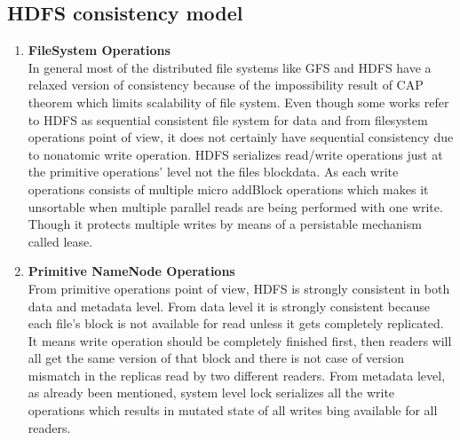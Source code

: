 \subsection{HDFS consistency model}
\begin{enumerate}
\item \textbf{FileSystem Operations}\\
In  general  most  of  the  distributed  file  systems   like  GFS  and  HDFS  have  a  relaxed
version  of  consistency   because  of  the  impossibility   result  of  CAP  theorem \cite{cap}
which  limits   scalability   of  file  system.  Even  though  some  works   refer  to  HDFS  as
sequential  consistent  file  system   for  data  and  from   filesystem   operations   point  of
view,  it  does   not  certainly   have  sequential  consistency   due  to  nonatomic   write
operation.  HDFS  serializes   read/write  operations  just at the primitive operations’ level
not  the  files   blockdata.  As  each write operations  consists  of multiple micro addBlock
operations   which  makes   it  unsortable  when  multiple  parallel  reads   are  being
performed with one write. Though it protects  multiple writes  by  means  of a persistable
mechanism called lease.
\item \textbf{Primitive NameNode Operations}\\
From   primitive  operations   point  of  view, HDFS is  strongly  consistent in both data and
metadata level.
From   data  level  it  is   strongly   consistent  because  each  file’s   block   is  not available for
read  unless   it  gets   completely   replicated.  It  means   write  operation  should  be
completely   finished  first,  then  readers   will  all  get  the  same  version  of  that  block   and
there is not case of version mismatch in the replicas read by two different readers.
From   metadata  level,  as   already   been  mentioned, system  level lock  serializes  all the
write  operations   which  results   in  mutated  state  of  all  writes   bing  available  for  all
readers.

\end{enumerate}

